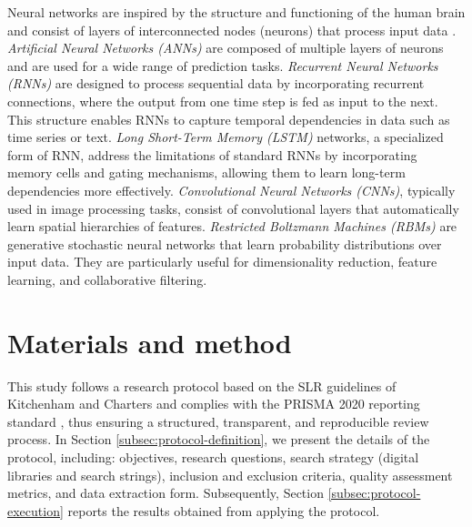 \documentclass[preprint,12pt]{elsarticle}
\begin{document}
Neural networks are inspired by the structure and functioning of the human brain and consist of layers of interconnected nodes (neurons) that process input data \cite{janiesch2021machine}. \textit{Artificial Neural Networks (ANNs)} are composed of multiple layers of neurons and are used for a wide range of prediction tasks. \textit{Recurrent Neural Networks (RNNs)} are designed to process sequential data by incorporating recurrent connections, where the output from one time step is fed as input to the next. This structure enables RNNs to capture temporal dependencies in data such as time series or text. \textit{Long Short-Term Memory (LSTM)} networks, a specialized form of RNN, address the limitations of standard RNNs by incorporating memory cells and gating mechanisms, allowing them to learn long-term dependencies more effectively. \textit{Convolutional Neural Networks (CNNs)}, typically used in image processing tasks, consist of convolutional layers that automatically learn spatial hierarchies of features. \textit{Restricted Boltzmann Machines (RBMs)} are generative stochastic neural networks that learn probability distributions over input data. They are particularly useful for dimensionality reduction, feature learning, and collaborative filtering.


\section{Materials and method}
\label{sec:methodology}

This study follows a research protocol based on the SLR guidelines of Kitchenham and Charters \cite{Kitchenham-Charters-guidelines} and complies with the PRISMA 2020 reporting standard \cite{PRISMA_2020_statement}, thus ensuring a structured, transparent, and reproducible review process. 
In Section \ref{subsec:protocol-definition}, we present the details of the protocol, including: objectives, research questions, search strategy (digital libraries and search strings), inclusion and exclusion criteria, quality assessment metrics, and data extraction form. Subsequently, Section \ref{subsec:protocol-execution} reports the results obtained from applying the protocol.
\end{document}
